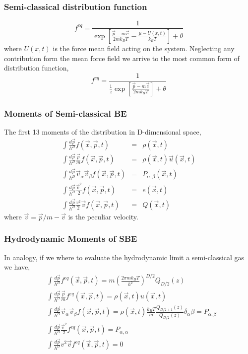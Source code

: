 \begin{frame}
	\frametitle{Semi-classical distribution function}
	\begin{equation}
		f^{eq}= \frac{1}{\exp \left[ \frac{\vec{p}-m\vec{c}}{2 m k_B T} -\frac{\mu - U(x,t)}{k_B T} \right] + \theta}
	\label{eq:full_semiclassical_pdf}
	\end{equation}
	where $U(x,t)$ is the force mean field acting on the system. Neglecting any contribution form the mean force field we arrive to the most common form of distribution function,
	\begin{equation}
		f^{eq}= \frac{1}{\frac{1}{z} \exp \left[ \frac{\vec{p}-m\vec{c}}{2 m k_B T} \right] + \theta}
	\label{eq:full_semiclassical_pdf}
	\end{equation}
\end{frame}

\begin{frame}
	\frametitle{Moments of Semi-classical BE}
	The first 13 moments of the distribution in D-dimensional space,
	\begin{eqnarray}
	\int \frac{d\vec{p}}{h^D} f(\vec{x},\vec{p},t) &=& \rho(\vec{x},t) \\
	\int \frac{d\vec{p}}{h^D} \frac{\vec{p}}{m} f(\vec{x},\vec{p},t) &=& \rho(\vec{x},t) \vec{u}(\vec{x},t) \\
	\int \frac{d\vec{p}}{h^D} \vec{v}_\alpha \vec{v}_\beta f(\vec{x},\vec{p},t) &=& P_{\alpha,\beta}(\vec{x},t) \\
	\int \frac{d\vec{p}}{h^D} \frac{\vec{v}^2}{2} f(\vec{x},\vec{p},t) &=& e(\vec{x},t) \\
	\int \frac{d\vec{p}}{h^D} \frac{v^2}{2}\vec{v} f(\vec{x},\vec{p},t) &=& Q(\vec{x},t) 
	\end{eqnarray}
	where $\vec{v} = \vec{p}/m - \vec{v}$ is the peculiar velocity.
\end{frame}

\begin{frame}
	\frametitle{Hydrodynamic Moments of SBE}
	In analogy, if we where to evaluate the hydrodynamic limit a semi-classical gas we have,
	\begin{align*}
	&\int \frac{d\vec{p}}{h^D} f^{eq}(\vec{x},\vec{p},t) = m \left( \frac{2\pi m k_B T}{h^2} \right)^{D/2} Q_{D/2}(z) \\
	&\int \frac{d\vec{p}}{h^D} \frac{\vec{p}}{m} f^{eq}(\vec{x},\vec{p},t) = \rho(\vec{x},t) u(\vec{x},t) \\
	&\int \frac{d\vec{p}}{h^D} \vec{v}_\alpha \vec{v}_\beta f(\vec{x},\vec{p},t) = \rho(\vec{x},t) \frac{k_B T}{m} \frac{Q_{D/2+1}(z)}{Q_{D/2}(z)}\delta_{\alpha}{\beta}  = P_{\alpha,\beta}\\
	&\int \frac{d\vec{p}}{h^D} \frac{\vec{v}^2}{2} f^{eq}(\vec{x},\vec{p},t) = P_{\alpha,\alpha} \\
	&\int \frac{d\vec{p}}{h^D} v^2 \vec{v} f^{eq}(\vec{x},\vec{p},t) = 0 
	\end{align*}
\end{frame}

